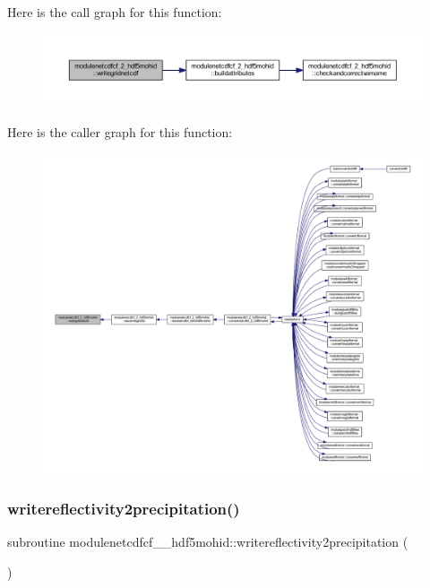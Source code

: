 Here is the call graph for this function\+:\nopagebreak
\begin{figure}[H]
\begin{center}
\leavevmode
\includegraphics[width=350pt]{namespacemodulenetcdfcf__2__hdf5mohid_ab80bf2060093fbfbc2ca158f9f70adc3_cgraph}
\end{center}
\end{figure}
Here is the caller graph for this function\+:\nopagebreak
\begin{figure}[H]
\begin{center}
\leavevmode
\includegraphics[width=350pt]{namespacemodulenetcdfcf__2__hdf5mohid_ab80bf2060093fbfbc2ca158f9f70adc3_icgraph}
\end{center}
\end{figure}
\mbox{\label{namespacemodulenetcdfcf__2__hdf5mohid_a349ec5caaf89753f5f078da13ba6a247}} 
\subsubsection{\texorpdfstring{writereflectivity2precipitation()}{writereflectivity2precipitation()}}
{\footnotesize\ttfamily subroutine modulenetcdfcf\+\_\+\_\+hdf5mohid\+::writereflectivity2precipitation (\begin{DoxyParamCaption}{ }\end{DoxyParamCaption})\hspace{0.3cm}{\ttfamily [private]}}

